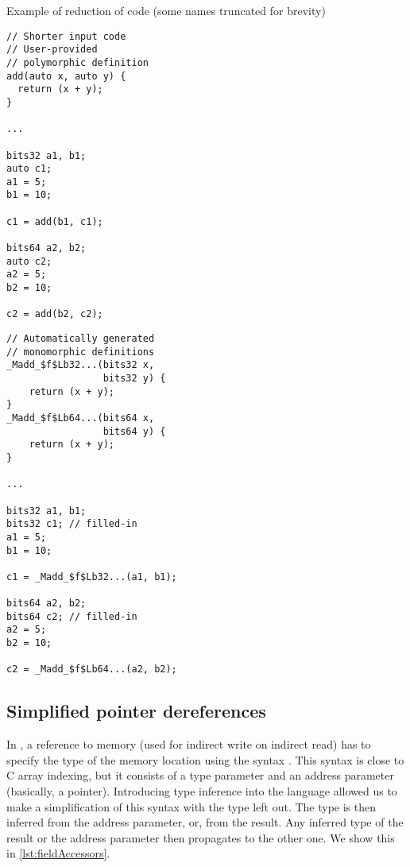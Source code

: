 \begin{listing}
    \caption{Example of reduction of code (some names truncated for brevity)}
    \label{lst:reduction}
    \begin{center}
    \begin{minipage}{0.5\linewidth}
    \begin{lstlisting}
// Shorter input code
// User-provided
// polymorphic definition
add(auto x, auto y) {
  return (x + y);
}

...

bits32 a1, b1;
auto c1;
a1 = 5;
b1 = 10;

c1 = add(b1, c1);

bits64 a2, b2;
auto c2;
a2 = 5;
b2 = 10;

c2 = add(b2, c2);
    \end{lstlisting}
    \end{minipage}%
    \begin{minipage}{0.5\linewidth}
    \begin{lstlisting}
// Automatically generated
// monomorphic definitions
_Madd_$f$Lb32...(bits32 x,
                 bits32 y) {
    return (x + y);
}
_Madd_$f$Lb64...(bits64 x,
                 bits64 y) {
    return (x + y);
}

...

bits32 a1, b1;
bits32 c1; // filled-in
a1 = 5;
b1 = 10;

c1 = _Madd_$f$Lb32...(a1, b1);

bits64 a2, b2;
bits64 c2; // filled-in
a2 = 5;
b2 = 10;

c2 = _Madd_$f$Lb64...(a2, b2);
    \end{lstlisting}
    \end{minipage}
    \end{center}
\end{listing}

\subsection{Simplified pointer dereferences}

In \cmm, a reference to memory (used for indirect write on indirect read) has to specify the type of the memory location using the syntax . This syntax is close to C array indexing, but it consists of a type parameter and an address parameter (basically, a pointer). Introducing type inference into the language allowed us to make a simplification of this syntax with the type left out. The type is then inferred from the address parameter, or, from the result. Any inferred type of the result or the address parameter then propagates to the other one. We show this in \cref{lst:fieldAccessors}.

